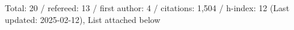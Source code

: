 Total: 20 / refereed: 13 / first author: 4 / citations: 1,504 / h-index: 12 (Last updated: 2025-02-12), List attached below